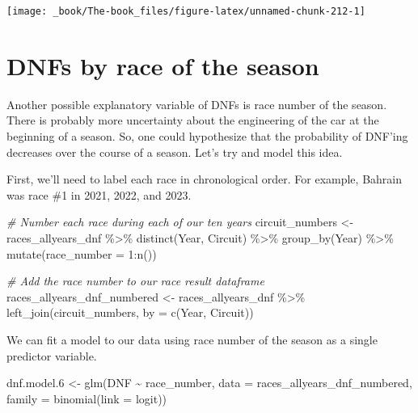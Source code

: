 \documentclass[
]{book}
\newenvironment{Shaded}{\begin{snugshade}}{\end{snugshade}}
\newcommand{\AttributeTok}[1]{\textcolor[rgb]{0.77,0.63,0.00}{#1}}
\newcommand{\CommentTok}[1]{\textcolor[rgb]{0.56,0.35,0.01}{\textit{#1}}}
\newcommand{\DecValTok}[1]{\textcolor[rgb]{0.00,0.00,0.81}{#1}}
\newcommand{\FloatTok}[1]{\textcolor[rgb]{0.00,0.00,0.81}{#1}}
\newcommand{\FunctionTok}[1]{\textcolor[rgb]{0.00,0.00,0.00}{#1}}
\newcommand{\NormalTok}[1]{#1}
\newcommand{\OtherTok}[1]{\textcolor[rgb]{0.56,0.35,0.01}{#1}}
\newcommand{\SpecialCharTok}[1]{\textcolor[rgb]{0.00,0.00,0.00}{#1}}
\newcommand{\StringTok}[1]{\textcolor[rgb]{0.31,0.60,0.02}{#1}}
\begin{document}
\begin{center}\texttt{[image: \_book/The-book\_files/figure-latex/unnamed-chunk-212-1]} \end{center}

\hypertarget{dnfs-by-race-of-the-season}{%
\section{DNFs by race of the season}\label{dnfs-by-race-of-the-season}}

Another possible explanatory variable of DNFs is race number of the season. There is probably more uncertainty about the engineering of the car at the beginning of a season. So, one could hypothesize that the probability of DNF'ing decreases over the course of a season. Let's try and model this idea.

First, we'll need to label each race in chronological order. For example, Bahrain was race \#1 in 2021, 2022, and 2023.

\begin{Shaded}
\begin{Highlighting}[]
\CommentTok{\# Number each race during each of our ten years}
\NormalTok{circuit\_numbers }\OtherTok{\textless{}{-}}\NormalTok{ races\_allyears\_dnf }\SpecialCharTok{\%\textgreater{}\%} 
  \FunctionTok{distinct}\NormalTok{(Year, Circuit) }\SpecialCharTok{\%\textgreater{}\%}
  \FunctionTok{group\_by}\NormalTok{(Year) }\SpecialCharTok{\%\textgreater{}\%} 
  \FunctionTok{mutate}\NormalTok{(}\AttributeTok{race\_number =} \DecValTok{1}\SpecialCharTok{:}\FunctionTok{n}\NormalTok{())}

\CommentTok{\# Add the race number to our race result dataframe}
\NormalTok{races\_allyears\_dnf\_numbered }\OtherTok{\textless{}{-}}\NormalTok{ races\_allyears\_dnf }\SpecialCharTok{\%\textgreater{}\%}
  \FunctionTok{left\_join}\NormalTok{(circuit\_numbers, }\AttributeTok{by =} \FunctionTok{c}\NormalTok{(}\StringTok{\textquotesingle{}Year\textquotesingle{}}\NormalTok{, }\StringTok{\textquotesingle{}Circuit\textquotesingle{}}\NormalTok{))}
\end{Highlighting}
\end{Shaded}

We can fit a model to our data using race number of the season as a single predictor variable.

\begin{Shaded}
\begin{Highlighting}[]
\NormalTok{dnf.model}\FloatTok{.6} \OtherTok{\textless{}{-}} \FunctionTok{glm}\NormalTok{(DNF }\SpecialCharTok{\textasciitilde{}}\NormalTok{ race\_number, }\AttributeTok{data =}\NormalTok{ races\_allyears\_dnf\_numbered,}
                   \AttributeTok{family =} \FunctionTok{binomial}\NormalTok{(}\AttributeTok{link =} \StringTok{\textquotesingle{}logit\textquotesingle{}}\NormalTok{))}
\end{Highlighting}
\end{Shaded}
\end{document}
